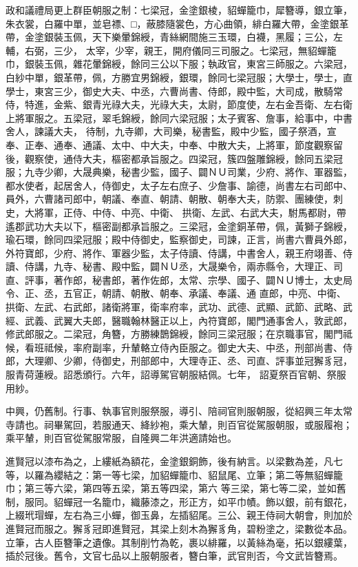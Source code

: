 \begin{pinyinscope}
 政和議禮局更上群臣朝服之制：七梁冠，金塗銀棱，貂蟬籠巾，犀簪導，銀立筆，朱衣裳，白羅中單，並皂褾、□，蔽膝隨裳色，方心曲領，緋白羅大帶，金塗銀革帶，金塗銀裝玉佩，天下樂暈錦綬，青絲網間施三玉環，白襪，黑履；三公，左輔，右弼，三少，
 太宰，少宰，親王，開府儀同三司服之。七梁冠，無貂蟬籠巾，銀裝玉佩，雜花暈錦綬，餘同三公以下服；執政官，東宮三師服之。六梁冠，白紗中單，銀革帶，佩，方勝宜男錦綬，銀環，餘同七梁冠服；大學士，學士，直學士，東宮三少，御史大夫、中丞，六曹尚書、侍郎，殿中監，大司成，散騎常侍，特進，金紫、銀青光祿大夫，光祿大夫，太尉，節度使，左右金吾衛、左右衛上將軍服之。五梁冠，翠毛錦綬，餘同六梁冠服；太子賓客、詹事，給事中，中書舍人，諫議大夫，
 待制，九寺卿，大司樂，秘書監，殿中少監，國子祭酒，宣奉、正奉、通奉、通議、太中、中大夫，中奉、中散大夫，上將軍，節度觀察留後，觀察使，通侍大夫，樞密都承旨服之。四梁冠，簇四盤雕錦綬，餘同五梁冠服；九寺少卿，大晟典樂，秘書少監，國子、闢ＮＵ司業，少府、將作、軍器監，都水使者，起居舍人，侍御史，太子左右庶子、少詹事、諭德，尚書左右司郎中、員外，六曹諸司郎中，朝議、奉直、朝請、朝散、朝奉大夫，防禦、團練使，刺史，大將軍，正侍、中侍、中亮、中衛、
 拱衛、左武、右武大夫，駙馬都尉，帶遙郡武功大夫以下，樞密副都承旨服之。三梁冠，金塗銅革帶，佩，黃獅子錦綬，瑜石環，餘同四梁冠服；殿中侍御史，監察御史，司諫，正言，尚書六曹員外郎，外符寶郎，少府、將作、軍器少監，太子侍讀、侍講，中書舍人，親王府翊善、侍讀、侍講，九寺、秘書、殿中監，闢ＮＵ丞，大晟樂令，兩赤縣令，大理正、司直、評事，著作郎，秘書郎，著作佐郎，太常、宗學、國子、闢ＮＵ博士，太史局令、正、丞，五官正，朝請、朝散、朝奉、承議、奉議、通
 直郎，中亮、中衛、拱衛、左武、右武郎，諸衛將軍，衛率府率，武功、武德、武顯、武節、武略、武經、武義、武翼大夫郎，醫職翰林醫正以上，內符寶郎，閣門通事舍人，敦武郎，修武郎服之。二梁冠，角簪，方勝練鵲錦綬，餘同三梁冠服；在京職事官，閣門祗候，看班祗候，率府副率，升輦輅立侍內臣服之。御史大夫、中丞，刑部尚書、侍郎，大理卿、少卿，侍御史，刑部郎中，大理寺正、丞、司直、評事並冠獬豸冠，服青荷蓮綬。詔悉頒行。六年，詔導駕官朝服結佩。七年，
 詔夏祭百官朝、祭服用紗。



 中興，仍舊制。行事、執事官則服祭服，導引、陪祠官則服朝服，從紹興三年太常寺請也。祠畢駕回，若服通天、絳紗袍，乘大輦，則百官從駕服朝服，或服履袍；乘平輦，則百官從駕服常服，自隆興二年洪適請始也。



 進賢冠以漆布為之，上縷紙為額花，金塗銀銅飾，後有納言。以梁數為差，凡七等，以羅為纓結之：第一等七梁，加貂蟬籠巾、貂鼠尾、立筆；第二等無貂蟬籠巾；第三等六梁，第四等五梁，第五等四梁，第六
 等三梁，第七等二梁，並如舊制，服同。貂蟬冠一名籠巾，織藤漆之，形正方，如平巾幘。飾以銀，前有銀花，上綴玳瑁蟬，左右為三小蟬，御玉鼻，左插貂尾。三公、親王侍祠大朝會，則加於進賢冠而服之。獬豸冠即進賢冠，其梁上刻木為獬豸角，碧粉塗之，梁數從本品。立筆，古人臣簪筆之遺像。其制削竹為乾，裹以緋羅，以黃絲為毫，拓以銀縷葉，插於冠後。舊令，文官七品以上服朝服者，簪白筆，武官則否，今文武皆簪焉。



\end{pinyinscope}